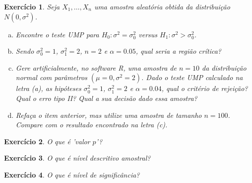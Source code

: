 \documentclass[letter,11pt]{article}
\newtheorem{exer}{Exercício}
\begin{document}
\begin{exer} \rm Seja $X_1, \ldots, X_n$ uma amostra aleatória obtida da distribuição $N(0, \sigma^2)$.
\begin{enumerate}[a)]
\item Encontre o teste UMP para $H_0:\sigma^2=\sigma_0^2$ versus $H_1:\sigma^2 > \sigma_0^2$.

\item Sendo $\sigma_0^2=1$, $\sigma^2_1=2$, $n=2$ e $\alpha=0.05$, qual seria a região crítica? 


\item Gere artificialmente, no software R, uma amostra de $n= 10$ da distribuição normal com parâmetros $(\mu=0, \sigma^2=2)$.  Dado o teste UMP calculado na letra (a), as hipóteses $\sigma_0^2=1$, $\sigma^2_1=2$ e $\alpha=0.04$, qual o critério de rejeição? Qual o erro tipo II? Qual a sua decisão dado essa amostra?

\item Refaça o item anterior, mas utilize uma amostra de tamanho $n=100$.  Compare com o resultado encontrado na letra (c).

\end{enumerate}
\end{exer}


\begin{exer} \rm O que é 'valor $p$'?
\end{exer}


\begin{exer} \rm O que é nível descritivo amostral? 
\end{exer}


\begin{exer} \rm O que é nível de significância?
\end{exer}
\end{document}
